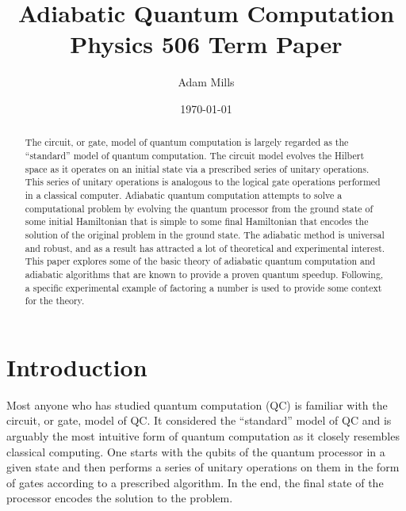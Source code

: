 \documentclass[%
 reprint,
 amsmath,amssymb,
 aps,
]{revtex4-1}
\begin{document}

\title{Adiabatic Quantum Computation \\ Physics 506 Term Paper}%

\author{Adam Mills}

\date{\today}%

\begin{abstract}
	The circuit, or gate, model of quantum computation is largely regarded as the ``standard'' model of quantum computation. The circuit model evolves the Hilbert space as it operates on an initial state via a prescribed series of unitary operations. This series of unitary operations is analogous to the logical gate operations performed in a classical computer. Adiabatic quantum computation attempts to solve a computational problem by evolving the quantum processor from the ground state of some initial Hamiltonian that is simple to some final Hamiltonian that encodes the solution of the original problem in the ground state. The adiabatic method is universal and robust, and as a result has attracted a lot of theoretical and experimental interest. This paper explores some of the basic theory of adiabatic quantum computation and adiabatic algorithms that are known to provide a proven quantum speedup. Following, a specific experimental example of factoring a number is used to provide some context for the theory.
\end{abstract}

\maketitle



\section{Introduction}

   Most anyone who has studied quantum computation (QC) is familiar with the circuit, or gate, model of QC\cite{Deutsch73}. It considered the ``standard'' model of QC and is arguably the most intuitive form of quantum computation as it closely resembles classical computing. One starts with the qubits of the quantum processor in a given state and then performs a series of unitary operations on them in the form of gates according to a prescribed algorithm. In the end, the final state of the processor encodes the solution to the problem. 
\end{document}

